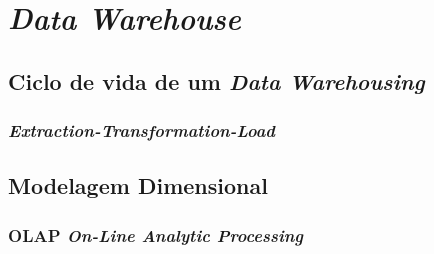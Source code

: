 \chapter{\textit{Data Warehouse}} 



\section{Ciclo de vida de um \textit{Data Warehousing}}



\subsection{\textit{Extraction-Transformation-Load}}

 
\section{Modelagem Dimensional}

 
\subsection{OLAP \textit{On-Line Analytic Processing}}
